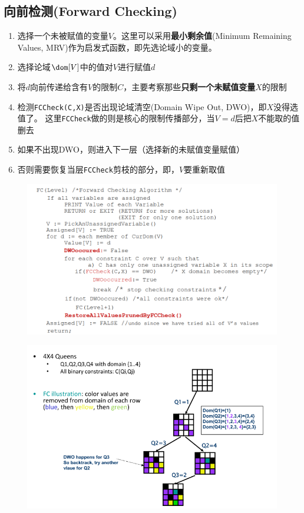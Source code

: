 \subsection{向前检测(Forward Checking)}
\begin{enumerate}
	\item 选择一个未被赋值的变量$V$。这里可以采用\textbf{最小剩余值}(Minimum Remaining Values, MRV)作为启发式函数，即先选论域小的变量。
	\item 选择论域$\dom[V]$中的值对$V$进行赋值$d$
	\item 将$d$向前传递给含有$V$的限制$C$，主要考察那些\textbf{只剩一个未赋值变量$X$}的限制
	\item 检测\verb'FCCheck(C,X)'是否出现论域清空(Domain Wipe Out, DWO)，即$X$没得选值了。
	这里\verb'FCCheck'做的则是核心的限制传播部分，当$V=d$后把$X$不能取的值删去
	\item 如果不出现DWO，则进入下一层（选择新的未赋值变量赋值）
	\item 否则需要恢复当层\verb'FCCheck'剪枝的部分，即，$V$要重新取值
\end{enumerate}
\begin{figure}[H]
\centering
\includegraphics[width=0.6\linewidth]{fig/forward_checking.png}
\end{figure}
\begin{figure}[H]
\centering
\includegraphics[width=0.6\linewidth]{fig/forward_checking_eg.png}
\end{figure}


